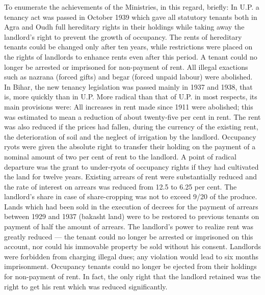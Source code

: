 \begin{multicols}{2}
To enumerate the achievements of the Ministries, in this regard, briefly: In U.P. a tenancy act was passed in October 1939 which gave all statutory tenants both in Agra and Oudh full hereditary rights in their holdings while taking away the landlord's right to prevent the growth of occupancy. The rents of hereditary tenants could be changed only after ten years, while restrictions were placed on the rights of landlords to enhance rents even after this period. A tenant could no longer be arrested or imprisoned for non-payment of rent. All illegal exactions such as nazrana (forced gifts) and begar (forced unpaid labour) were abolished. In Bihar, the new tenancy legislation was passed mainly in 1937 and 1938, that is, more quickly than in U.P. More radical than that of U.P. in most respects, its main provisions were: All increases in rent made since 1911 were abolished; this was estimated to mean a reduction of about twenty-five per cent in rent. The rent was also reduced if the prices had fallen, during the currency of the existing rent, the deterioration of soil and the neglect of irrigation by the landlord. Occupancy ryots were given the absolute right to transfer their holding on the payment of a nominal amount of two per cent of rent to the landlord. A point of radical departure was the grant to under-ryots of occupancy rights if they had cultivated the land for twelve years. Existing arrears of rent were substantially reduced and the rate of interest on arrears was reduced from 12.5 to 6.25 per cent. The landlord's share in case of share-cropping was not to exceed 9/20 of the produce. Lands which had been sold in the execution of decrees for the payment of arrears between 1929 and 1937 (bakasht land) were to be restored to previous tenants on payment of half the amount of arrears. The landlord's power to realize rent was greatly reduced --- the tenant could no longer be arrested or imprisoned on this account, nor could his immovable property be sold without his consent. Landlords were forbidden from charging illegal dues; any violation would lead to six months imprisonment. Occupancy tenants could no longer be ejected from their holdings for non-payment of rent. In fact, the only right that the landlord retained was the right to get his rent which was reduced significantly. 


\end{multicols}
